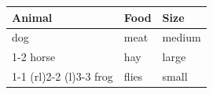 \documentclass{article}
\begin{document}
	\begin{tabular}{lll}
		\toprule
		Animal & Food  & Size   \\
		\midrule
		dog    & meat  & medium \\
		\cmidrule{1-2}
		horse  & hay   & large  \\
		\cmidrule(r){1-1}
		\cmidrule(rl){2-2}
		\cmidrule(l){3-3}
		frog   & flies & small  \\
		\bottomrule
	\end{tabular}
\end{document}
